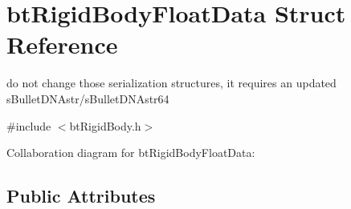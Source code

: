 \hypertarget{structbt_rigid_body_float_data}{\section{bt\+Rigid\+Body\+Float\+Data Struct Reference}
\label{structbt_rigid_body_float_data}
}


do not change those serialization structures, it requires an updated s\+Bullet\+D\+N\+Astr/s\+Bullet\+D\+N\+Astr64  




{\ttfamily \#include $<$bt\+Rigid\+Body.\+h$>$}



Collaboration diagram for bt\+Rigid\+Body\+Float\+Data\+:
\subsection*{Public Attributes}
